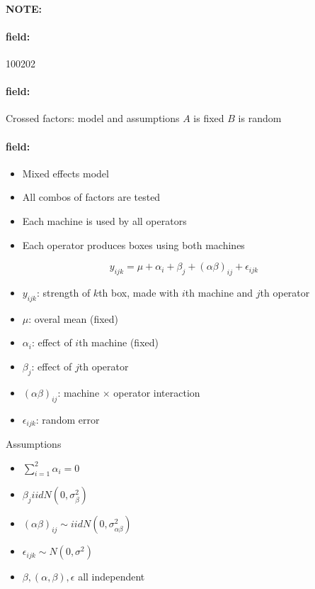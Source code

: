 \documentclass[12pt]{article}
\newenvironment{note}{\paragraph{NOTE:}}{}
\newenvironment{field}{\paragraph{field:}}{}
\begin{document}
\begin{note}
    \begin{field}
        \tiny 100202
    \end{field}
    \begin{field}
        Crossed factors: model and assumptions $A$ is fixed $B $ is random
    \end{field}
    \begin{field}
        \begin{itemize}
          \item Mixed effects model
          \item All combos of factors are tested
          \item Each machine is used by all operators
          \item Each operator produces boxes using both machines
        \end{itemize}
        $$y_{ijk} = \mu + \alpha_i + \beta_j + (\alpha\beta)_{ij} + \epsilon_{ijk} $$
        \begin{itemize}
          \item $y_{ijk}$: strength of $k$th box, made with $i$th machine and $j$th operator
          \item $\mu$: overal mean (fixed)
          \item $\alpha_i$: effect of $i$th machine (fixed)
          \item $\beta_j$: effect of $j$th operator
          \item $(\alpha\beta)_{ij}$: machine $\times$ operator interaction
          \item $\epsilon_{ijk}$: random error
        \end{itemize}
        Assumptions
        \begin{itemize}
          \item $\sum_{i=1}^2 \alpha_i = 0$
          \item $\beta_j iid N(0,\sigma_\beta^2)$
          \item $(\alpha\beta)_{ij} \sim iid N(0,\sigma_{\alpha\beta}^2)$
          \item $\epsilon_{ijk} \sim N(0,\sigma^2)$
          \item $\beta,(\alpha,\beta),\epsilon$ all independent
        \end{itemize}
    \end{field}
\end{note}
\end{document}
